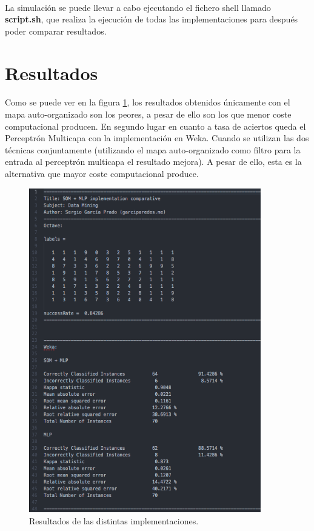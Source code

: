 \documentclass[10pt, a4paper,spanish]{article}
\begin{document}
			\paragraph{}
			La simulación se puede llevar a cabo ejecutando el fichero shell llamado \textbf{script.sh}, que realiza la ejecución de todas las implementaciones para después poder comparar resultados.

	\section{Resultados}

		\paragraph{}
		Como se puede ver en la figura \ref{fig:results}, los resultados obtenidos únicamente con el mapa auto-organizado son los peores, a pesar de ello son los que menor coste computacional producen. En segundo lugar en cuanto a tasa de aciertos queda el Perceptrón Multicapa con la implementación en Weka. Cuando se utilizan las dos técnicas conjuntamente (utilizando el mapa auto-organizado como filtro para la entrada al perceptrón multicapa el resultado mejora). A pesar de ello, esta es la alternativa que mayor coste computacional produce.

		\begin{figure}[htb]
			\centering
			\includegraphics[width=0.9\textwidth]{results}
			\caption{Resultados de las distintas implementaciones.}
            \label{fig:results}
		\end{figure}
\end{document}
